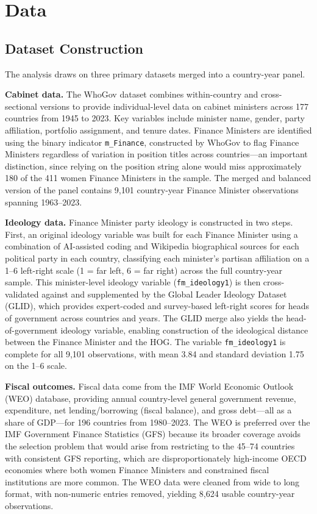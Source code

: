 \documentclass[12pt]{article}
\begin{document}
\section{Data}
\label{sec:data}

\subsection{Dataset Construction}

The analysis draws on three primary datasets merged into a country-year panel.

\textbf{Cabinet data.} The WhoGov dataset \citep{nyrup2020} combines
within-country and cross-sectional versions to provide individual-level data on
cabinet ministers across 177 countries from 1945 to 2023. Key variables include
minister name, gender, party affiliation, portfolio assignment, and tenure dates.
Finance Ministers are identified using the binary indicator \texttt{m\_Finance},
constructed by WhoGov to flag Finance Ministers regardless of variation in
position titles across countries---an important distinction, since relying on
the position string alone would miss approximately 180 of the 411 women Finance
Ministers in the sample. The merged and balanced version of the panel contains
9,101 country-year Finance Minister observations spanning 1963--2023.

\textbf{Ideology data.} Finance Minister party ideology is constructed in two
steps. First, an original ideology variable was built for each Finance Minister
using a combination of AI-assisted coding and Wikipedia biographical sources for each political party in each country,
classifying each minister's partisan affiliation on a 1--6 left-right scale
(1 = far left, 6 = far right) across the full country-year sample. This
minister-level ideology variable (\texttt{fm\_ideology1}) is then
cross-validated against and supplemented by the Global Leader Ideology Dataset
(GLID), which provides expert-coded and survey-based left-right scores for heads
of government across countries and years. The GLID merge also yields the
head-of-government ideology variable, enabling construction of the ideological
distance between the Finance Minister and the HOG. The variable
\texttt{fm\_ideology1} is complete for all 9,101 observations, with mean 3.84
and standard deviation 1.75 on the 1--6 scale.

\textbf{Fiscal outcomes.} Fiscal data come from the IMF World Economic Outlook
(WEO) database, providing annual country-level general government revenue,
expenditure, net lending/borrowing (fiscal balance), and gross debt---all as a
share of GDP---for 196 countries from 1980--2023. The WEO is preferred over the
IMF Government Finance Statistics (GFS) because its broader coverage avoids the
selection problem that would arise from restricting to the 45--74 countries with
consistent GFS reporting, which are disproportionately high-income OECD economies
where both women Finance Ministers and constrained fiscal institutions are more
common. The WEO data were cleaned from wide to long format, with non-numeric
entries removed, yielding 8,624 usable country-year observations.
\end{document}
